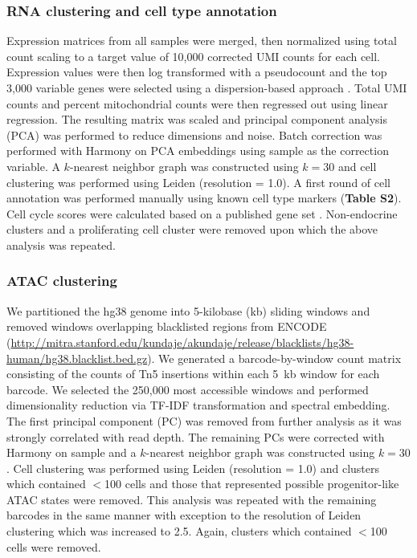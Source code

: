 \subsubsection{RNA clustering and cell type annotation}
Expression matrices from all samples were merged, then normalized using total count scaling to a target value of 10{,}000 corrected UMI counts for each cell. Expression values were then log transformed with a pseudocount and the top 3{,}000 variable genes were selected using a dispersion-based approach \cite{Satija2015-rq}. Total UMI counts and percent mitochondrial counts were then regressed out using linear regression. The resulting matrix was scaled and principal component analysis (PCA) was performed to reduce dimensions and noise. Batch correction was performed with Harmony \cite{Korsunsky2019-pn} on PCA embeddings using sample as the correction variable. A $k$-nearest neighbor graph was constructed using $k = 30$ and cell clustering was performed using Leiden (resolution = 1.0). A first round of cell annotation was performed manually using known cell type markers (\textbf{Table S2}). Cell cycle scores were calculated based on a published gene set \cite{Tirosh2016-xd}. Non-endocrine clusters and a proliferating cell cluster were removed upon which the above analysis was repeated.

\subsubsection{ATAC clustering}
We partitioned the hg38 genome into 5-kilobase (kb) sliding windows and removed windows overlapping blacklisted regions from ENCODE (\url{http://mitra.stanford.edu/kundaje/akundaje/release/blacklists/hg38-human/hg38.blacklist.bed.gz}). We generated a barcode-by-window count matrix consisting of the counts of Tn5 insertions within each 5~kb window for each barcode. We selected the 250{,}000 most accessible windows and performed dimensionality reduction via TF-IDF transformation and spectral embedding. The first principal component (PC) was removed from further analysis as it was strongly correlated with read depth. The remaining PCs were corrected with Harmony on sample and a $k$-nearest neighbor graph was constructed using $k = 30$. Cell clustering was performed using Leiden (resolution = 1.0) and clusters which contained $<$100 cells and those that represented possible progenitor-like ATAC states were removed. This analysis was repeated with the remaining barcodes in the same manner with exception to the resolution of Leiden clustering which was increased to 2.5. Again, clusters which contained $<$100 cells were removed.


